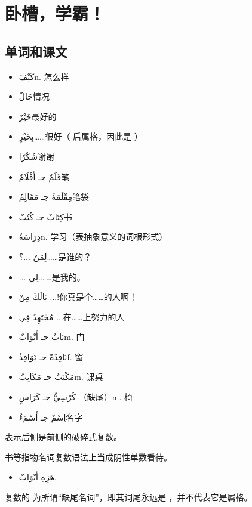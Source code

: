 \chapter{卧槽，学霸！}

\section{ 单词和课文}

\begin{itemize}
    \item \ac{كَيْفَ}{n. 怎么样}
    \item \ac{حَالٌ}{情况}
    \item \ac{خَيْرٌ}{最好的}
    \item \ac{بِخَيْرٍ}{……很好（ 后属格，因此是 ）}
    \item \ac{شُكْرًا}{谢谢}
    \item \ac{قَلَمٌ جـ أَقْلَامٌ}{笔}
    \item \ac{مِقْلَمَةٌ جـ مَقَالِمُ}{笔袋}
    \item \ac{كِتَابٌ جـ كُتُبٌ}{书}
    \item \ac{دِرَاسَةٌ}{n. 学习（表抽象意义的词根形式）}
    \item \ac{لِمَنْ ...؟}{……是谁的？}
    \item \ac{... لِي.}{……是我的。}
    \item \ac{يَالَكَ مِنْ ...!}{你真是个……的人啊！}
    \item \ac{مُجْتَهِدٌ فِي ...}{在……上努力的人}
    \item \ac{بَابٌ جـ أَبْوَابٌ}{m. 门}
    \item \ac{نَافِذَةٌ جـ نَوَافِذُ}{f. 窗}
    \item \ac{مَكْتَبٌ جـ مَكَايِبُ}{m. 课桌}
    \item \ac{كُرْسِيٌّ جـ كَرَاسٍ }{（缺尾）m. 椅}
    \item \ac{اِسْمٌ جـ أَسْمَءٌ}{名字}
\end{itemize}

\begin{attention}
     表示后侧是前侧的破碎式复数。

    书等指物名词复数语法上当成阴性单数看待。

    \begin{Arabic}
        \begin{itemize}
            \item هَزِهِ أَبْوَابٌ.
        \end{itemize}
    \end{Arabic}

    复数的  为所谓``缺尾名词''，即其词尾永远是 ，并不代表它是属格。
\end{attention}

